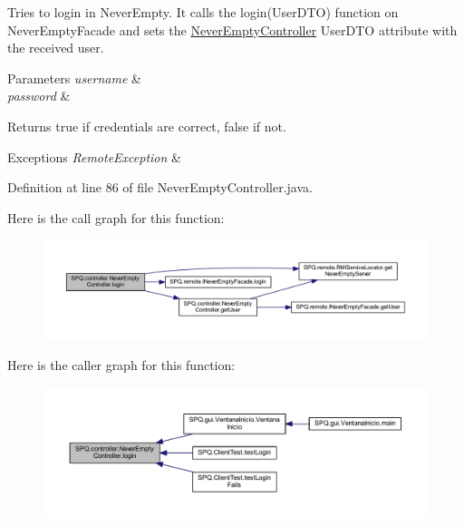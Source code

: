 Tries to login in Never\+Empty. It calls the login(\+User\+D\+T\+O) function on Never\+Empty\+Facade and sets the \mbox{\hyperlink{class_s_p_q_1_1controller_1_1_never_empty_controller}{Never\+Empty\+Controller}} User\+D\+TO attribute with the received user. 
\begin{DoxyParams}{Parameters}
{\em username} & \\
\hline
{\em password} & \\
\hline
\end{DoxyParams}
\begin{DoxyReturn}{Returns}
true if credentials are correct, false if not. 
\end{DoxyReturn}

\begin{DoxyExceptions}{Exceptions}
{\em Remote\+Exception} & \\
\hline
\end{DoxyExceptions}


Definition at line 86 of file Never\+Empty\+Controller.\+java.

Here is the call graph for this function\+:
\nopagebreak
\begin{figure}[H]
\begin{center}
\leavevmode
\includegraphics[width=350pt]{class_s_p_q_1_1controller_1_1_never_empty_controller_adb8f5dbbfedb5f3c231de53dccc88899_cgraph}
\end{center}
\end{figure}
Here is the caller graph for this function\+:
\nopagebreak
\begin{figure}[H]
\begin{center}
\leavevmode
\includegraphics[width=350pt]{class_s_p_q_1_1controller_1_1_never_empty_controller_adb8f5dbbfedb5f3c231de53dccc88899_icgraph}
\end{center}
\end{figure}
\mbox{\label{class_s_p_q_1_1controller_1_1_never_empty_controller_aefc0dae2c43c2960719176d390f3ad9c}} 
